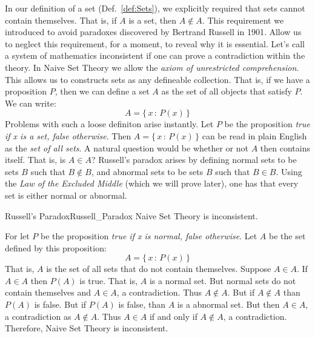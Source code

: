         In our definition of a set (Def.~\ref{def:Sets}), we explicitly
        required that sets cannot contain themselves. That is, if
        $A$ is a set, then $A\notin{A}$. This requirement we introduced to
        avoid paradoxes discovered by Bertrand Russell in 1901. Allow us to
        neglect this requirement, for a moment, to reveal why it is essential.
        Let's call a system of mathematics inconsistent if one can prove
        a contradiction within the theory. In Naive Set Theory we allow the
        \textit{axiom of unrestricted comprehension}. This allows us to
        constructs sets as any defineable collection. That is, if we have a
        proposition $P$, then we can define a set $A$ as the set of all objects
        that satisfy $P$. We can write:
        \begin{equation}
            A=\{\,x\,:\,P(x)\,\}
        \end{equation}
        Problems with such a loose definiton arise instantly. Let $P$ be the
        proposition \textit{true if x is a set, false otherwise}. Then
        $A=\{\,x\,:\,P(x)\,\}$ can be read in plain English as the
        \textit{set of all sets}. A natural question would be whether or not
        $A$ then contains itself. That is, is $A\in{A}$? Russell's paradox
        arises by defining normal sets to be sets $B$ such that $B\notin{B}$,
        and abnormal sets to be sets $B$ such that $B\in{B}$. Using the
        \textit{Law of the Excluded Middle} (which we will prove later), one
        has that every set is either normal or abnormal.
        \begin{ftheorem}{Russell's Paradox}{Russell_Paradox}
            Naive Set Theory is inconsistent.
        \end{ftheorem}
        \begin{bproof}
            For let $P$ be the proposition
            \textit{true if x is normal, false otherwise}. Let $A$ be the
            set defined by this proposition:
            \begin{equation}
                A=\{\,x\,:\,P(x)\,\}
            \end{equation}
            That is, $A$ is the set of all sets that do not contain themselves.
            Suppose $A\in{A}$. If $A\in{A}$ then $P(A)$ is true. That is,
            $A$ is a normal set. But normal sets do not contain themselves and
            $A\in{A}$, a contradiction. Thus $A\notin{A}$. But if
            $A\notin{A}$ than $P(A)$ is false. But if $P(A)$ is false, than
            $A$ is a abnormal set. But then $A\in{A}$, a contradiction as
            $A\notin{A}$. Thus $A\in{A}$ if and only if $A\notin{A}$, a
            contradiction. Therefore, Naive Set Theory is inconsistent.
        \end{bproof}
